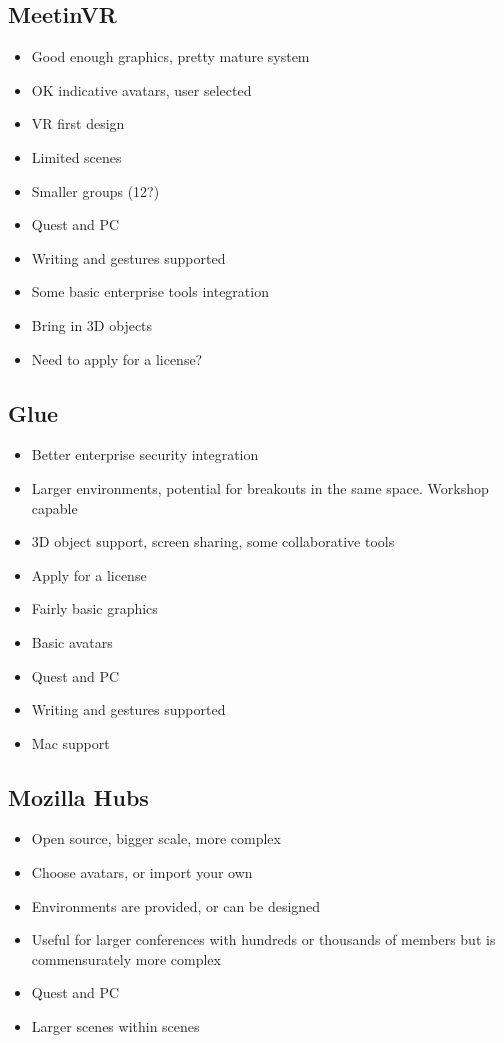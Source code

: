 \subsection{MeetinVR}
\begin{itemize}
\item Good enough graphics, pretty mature system
\item OK indicative avatars, user selected
\item VR first design
\item Limited scenes
\item Smaller groups (12?)
\item Quest and PC
\item Writing and gestures supported
\item Some basic enterprise tools integration
\item Bring in 3D objects
\item Need to apply for a license?
\end{itemize}
\subsection{Glue}
\begin{itemize}
\item Better enterprise security integration
\item Larger environments, potential for breakouts in the same space. Workshop capable
\item 3D object support, screen sharing, some collaborative tools
\item Apply for a license
\item Fairly basic graphics
\item Basic avatars
\item Quest and PC
\item Writing and gestures supported
\item Mac support
\end{itemize}
\subsection{Mozilla Hubs}
\begin{itemize}
\item Open source, bigger scale, more complex
\item Choose avatars, or import your own
\item Environments are provided, or can be designed
\item Useful for larger conferences with hundreds or thousands of members but is commensurately more complex
\item Quest and PC
\item Larger scenes within scenes
\end{itemize}
